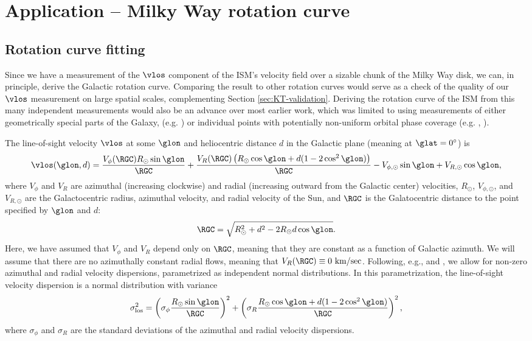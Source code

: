 \section{Application -- Milky Way rotation curve}
\label{sec:rotation_curve}

\subsection{Rotation curve fitting}
Since we have a measurement of the $\vlos$ component of the ISM's velocity field over a sizable chunk of the Milky Way disk, we can, in principle, derive the Galactic rotation curve.
Comparing the result to other rotation curves would serve as a check of the quality of our $\vlos$ measurement on large spatial scales, complementing Section \ref{sec:KT-validation}.
Deriving the rotation curve of the ISM from this many independent measurements would also be an advance over most earlier work, which was limited to using measurements of either geometrically special parts of the Galaxy, (e.g. \Clemens) or individual points with potentially non-uniform orbital phase coverage (e.g. \citealt{Reid:2009jb}, \Reid). 

The line-of-sight velocity $\vlos$ at some $\glon$ and heliocentric distance $d$ in the Galactic plane (meaning at $\glat=0^\circ$) is 
\begin{equation}
\label{eqn:vlos_mean}
\vlos(\glon, d) = \frac{V_\phi (\RGC) R_\odot \sin\glon}{\RGC} + 
\frac{V_R (\RGC) \left(R_\odot \cos \glon + d (1 - 2 \cos^2 \glon)  \right) }{\RGC} - V_{\phi, \odot} \sin \glon + V_{R, \odot} \cos \glon,
\end{equation}
where $V_\phi$ and $V_R$ are azimuthal (increasing clockwise) and radial (increasing outward from the Galactic center) velocities, $R_\odot$, $V_{\phi, \odot}$, and $V_{R, \odot}$ are the Galactocentric radius, azimuthal velocity, and radial velocity of the Sun, and $\RGC$ is the Galatocentric distance to the point specified by $\glon$ and $d$:
\begin{equation}
\RGC = \sqrt{R^2_\odot + d^2 - 2 R_\odot d \cos \glon}.
\end{equation}
Here, we have assumed that $V_\phi$ and $V_R$ depend only on $\RGC$, meaning that they are constant as a function of Galactic azimuth.
We will assume that there are no azimuthally constant radial flows, meaning that $V_R(\RGC) \equiv 0\text{ km/sec}$.
Following, e.g., \citet{Reid:2009jb} and \citet{Bovy_2009}, we allow for non-zero azimuthal and radial velocity dispersions, parametrized as independent normal distributions. 
In this parametrization, the line-of-sight velocity dispersion is a normal distribution with variance
\begin{equation}
\label{eqn:vlos_var}
\sigma^2_\mathrm{los} = \left(\sigma_\phi \frac{R_\odot \sin \glon}{\RGC} \right)^2 + 
\left(\sigma_R  \frac{R_\odot \cos \glon + d (1 - 2 \cos^2 \glon)}{\RGC} \right)^2,
\end{equation}
where $\sigma_\phi$ and $\sigma_R$ are the standard deviations of the azimuthal and radial velocity dispersions. 

